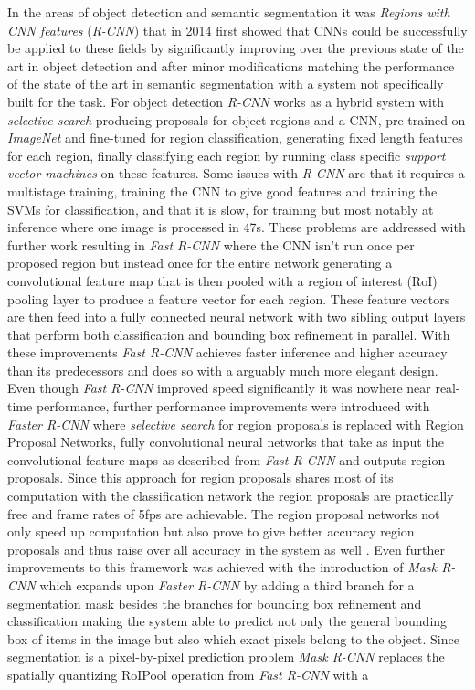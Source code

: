 \documentclass[11pt]{article}
\newcommand{\bibentry}[1]{\cite{#1}}
\begin{document}
In the areas of object detection and semantic segmentation it was \emph{Regions with CNN features} (\emph{R-CNN}) \bibentry{girshick2014rich} that in 2014 first showed that CNNs could be successfully be applied to these fields by significantly improving over the previous state of the art in object detection \bibentry{ren2013histograms} and after minor modifications matching the performance of the state of the art in semantic segmentation \bibentry{carreira2012semantic} with a system not specifically built for the task. For object detection \emph{R-CNN} works as a hybrid system with \emph{selective search} \bibentry{uijlings2013selective} producing proposals for object regions and a CNN, pre-trained on \emph{ImageNet} \bibentry{deng2009imagenet} and fine-tuned for region classification, generating fixed length features for each region, finally classifying each region by running class specific \emph{support vector machines} \bibentry{boser1992training} on these features. Some issues with \emph{R-CNN} are that it requires a multistage training, training the CNN to give good features and training the SVMs for classification, and that it is slow, for training but most notably at inference where one image is processed in 47s. These problems are addressed with further work resulting in \emph{Fast R-CNN} \bibentry{girshick2015fast} where the CNN isn't run once per proposed region but instead once for the entire network generating a convolutional feature map that is then pooled with a region of interest (RoI) pooling layer to produce a feature vector for each region. These feature vectors are then feed into a fully connected neural network with two sibling output layers that perform both classification and bounding box refinement in parallel. With these improvements \emph{Fast R-CNN} achieves faster inference and higher accuracy than its predecessors and does so with a arguably much more elegant design. Even though \emph{Fast R-CNN} improved speed significantly it was nowhere near real-time performance, further performance improvements were introduced with \emph{Faster R-CNN} \bibentry{ren2015faster} where \emph{selective search} for region proposals is replaced with Region Proposal Networks, fully convolutional neural networks that take as input the convolutional feature maps as described from \emph{Fast R-CNN} and outputs region proposals. Since this approach for region proposals shares most of its computation with the classification network the region proposals are practically free and frame rates of 5fps are achievable. The region proposal networks not only speed up computation but also prove to give better accuracy region proposals and thus raise over all accuracy in the system as well \bibentry{ren2015faster}. Even further improvements to this framework was achieved with the introduction of \emph{Mask R-CNN} \bibentry{he2017mask} which expands upon \emph{Faster R-CNN} by adding a third branch for a segmentation mask besides the branches for bounding box refinement and classification making the system able to predict not only the general bounding box of items in the image but also which exact pixels belong to the object. Since segmentation is a pixel-by-pixel prediction problem \emph{Mask R-CNN} replaces the spatially quantizing RoIPool operation from \emph{Fast R-CNN} with a 
\end{document}
